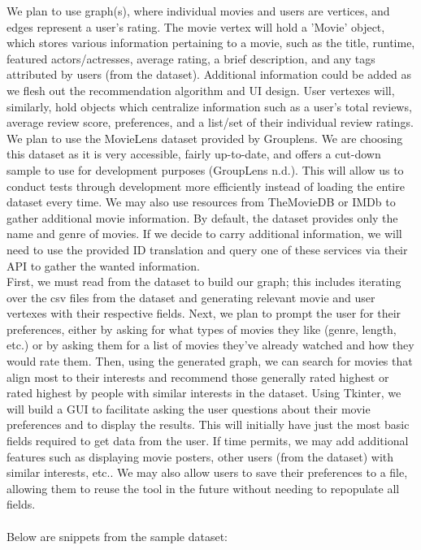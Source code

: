 \documentclass[11pt]{article}
\begin{document}
We plan to use graph(s), where individual movies and users are vertices, and edges represent a user's rating. The movie vertex will hold a 'Movie' object, which stores various information pertaining to a movie, such as the title, runtime, featured actors/actresses, average rating, a brief description, and any tags attributed by users (from the dataset). Additional information could be added as we flesh out the recommendation algorithm and UI design. User vertexes will, similarly, hold objects which centralize information such as a user's total reviews, average review score, preferences, and a list/set of their individual review ratings. 
We plan to use the MovieLens dataset provided by Grouplens. We are choosing this dataset as it is very accessible, fairly up-to-date, and offers a cut-down sample to use for development purposes (GroupLens n.d.). This will allow us to conduct tests through development more efficiently instead of loading the entire dataset every time. We may also use resources from TheMovieDB or IMDb to gather additional movie information. By default, the dataset provides only the name and genre of movies. If we decide to carry additional information, we will need to use the provided ID translation and query one of these services via their API to gather the wanted information. \\
First, we must read from the dataset to build our graph; this includes iterating over the csv files from the dataset and generating relevant movie and user vertexes with their respective fields. Next, we plan to prompt the user for their preferences, either by asking for what types of movies they like (genre, length, etc.) or by asking them for a list of movies they've already watched and how they would rate them. Then, using the generated graph, we can search for movies that align most to their interests and recommend those generally rated highest or rated highest by people with similar interests in the dataset. Using Tkinter, we will build a GUI to facilitate asking the user questions about their movie preferences and to display the results. This will initially have just the most basic fields required to get data from the user. If time permits, we may add additional features such as displaying movie posters, other users (from the dataset) with similar interests, etc.. We may also allow users to save their preferences to a file, allowing them to reuse the tool in the future without needing to repopulate all fields.\\\\
Below are snippets from the sample dataset:
\end{document}
